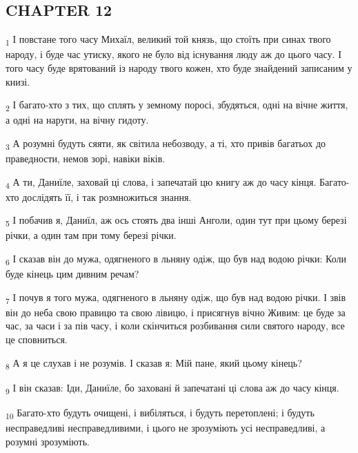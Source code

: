 \subsection{CHAPTER 12}
\begin{tcolorbox}
\textsubscript{1} І повстане того часу Михаїл, великий той князь, що стоїть при синах твого народу, і буде час утиску, якого не було від існування люду аж до цього часу. І того часу буде врятований із народу твого кожен, хто буде знайдений записаним у книзі.
\end{tcolorbox}
\begin{tcolorbox}
\textsubscript{2} І багато-хто з тих, що сплять у земному поросі, збудяться, одні на вічне життя, а одні на наруги, на вічну гидоту.
\end{tcolorbox}
\begin{tcolorbox}
\textsubscript{3} А розумні будуть сяяти, як світила небозводу, а ті, хто привів багатьох до праведности, немов зорі, навіки віків.
\end{tcolorbox}
\begin{tcolorbox}
\textsubscript{4} А ти, Даниїле, заховай ці слова, і запечатай цю книгу аж до часу кінця. Багато-хто дослідять її, і так розмножиться знання.
\end{tcolorbox}
\begin{tcolorbox}
\textsubscript{5} І побачив я, Даниїл, аж ось стоять два інші Анголи, один тут при цьому березі річки, а один там при тому березі річки.
\end{tcolorbox}
\begin{tcolorbox}
\textsubscript{6} І сказав він до мужа, одягненого в льняну одіж, що був над водою річки: Коли буде кінець цим дивним речам?
\end{tcolorbox}
\begin{tcolorbox}
\textsubscript{7} І почув я того мужа, одягненого в льняну одіж, що був над водою річки. І звів він до неба свою правицю та свою лівицю, і присягнув вічно Живим: це буде за час, за часи і за пів часу, і коли скінчиться розбивання сили святого народу, все це сповниться.
\end{tcolorbox}
\begin{tcolorbox}
\textsubscript{8} А я це слухав і не розумів. І сказав я: Мій пане, який цьому кінець?
\end{tcolorbox}
\begin{tcolorbox}
\textsubscript{9} І він сказав: Іди, Даниїле, бо заховані й запечатані ці слова аж до часу кінця.
\end{tcolorbox}
\begin{tcolorbox}
\textsubscript{10} Багато-хто будуть очищені, і вибіляться, і будуть перетоплені; і будуть несправедливі несправедливими, і цього не зрозуміють усі несправедливі, а розумні зрозуміють.
\end{tcolorbox}

